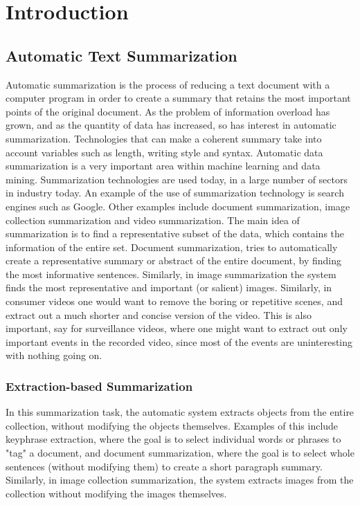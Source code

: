 \chapter{Introduction}
\section{Automatic Text Summarization}
Automatic summarization is the process of reducing a text document with a computer program in order to create a summary that retains the most important points of the original document. As the problem of information overload has grown, and as the quantity of data has increased, so has interest in automatic summarization. Technologies that can make a coherent summary take into account variables such as length, writing style and syntax. Automatic data summarization is a very important area within machine learning and data mining. Summarization technologies are used today, in a large number of sectors in industry today. An example of the use of summarization technology is search engines such as Google. Other examples include document summarization, image collection summarization and video summarization. The main idea of summarization is to find a representative subset of the data, which contains the information of the entire set. Document summarization, tries to automatically create a representative summary or abstract of the entire document, by finding the most informative sentences. Similarly, in image summarization the system finds the most representative and important (or salient) images. Similarly, in consumer videos one would want to remove the boring or repetitive scenes, and extract out a much shorter and concise version of the video. This is also important, say for surveillance videos, where one might want to extract out only important events in the recorded video, since most of the events are uninteresting with nothing going on.
\pagebreak

\subsection{Extraction-based Summarization}

In this summarization task, the automatic system extracts objects from the entire collection, without modifying the objects themselves. Examples of this include keyphrase extraction, where the goal is to select individual words or phrases to "tag" a document, and document summarization, where the goal is to select whole sentences (without modifying them) to create a short paragraph summary. Similarly, in image collection summarization, the system extracts images from the collection without modifying the images themselves.

